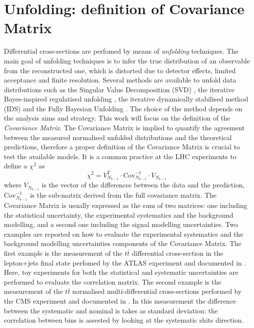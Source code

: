\documentclass[12pt]{article}
\begin{document}
\section{Unfolding: definition of Covariance Matrix}
Differential cross-sections are perfomed by means of \emph{unfolding} techniques. The main goal of unfolding techniques is to infer the true distribution of an observable from the reconstructed one, which is distorted due to detector effects, limited acceptance and finite resolution. 
Several methods are available to unfold data distributions such as the Singular Value Decomposition (SVD) \cite{H_cker_1996}, the iterative Bayes-inspired regulatised unfolding \cite{DAGOSTINI1995487}, the iterative dynamically stabilised method (IDS) \cite{malaescu2009iterative} and the Fully Bayesian Unfolding \cite{choudalakis2012fully}. The choice of the method depends on the analysis aims and strategy. 
This work will focus on the definition of the \emph{Covariance Matrix}. The Covariance Matrix is implied to quantify the agreement between the measured normalised unfolded distributions and the theoretical predictions, therefore a proper definition of the Covariance Matrix is crucial to test the available models. It is a common practice at the LHC experiments to define a $\chi^2$ as
\begin{equation}
\chi^2 = V^T_{N_{b-1}}\cdot\mathrm{Cov}^{-1}_{N_{b-1}}\cdot V_{N_{b-1}}
\end{equation}
where $V_{N_{b-1}}$ is the vector of the differences between the data and the prediction, $\mathrm{Cov}^{-1}_{N_{b-1}}$ is the sub-matrix derived from the full covariance matrix.
The Covariance Matrix is usually expressed as the sum of two matrices: one including the statistical uncertainty, the experimental systematics and the background modelling, and a second one including the signal modelling uncertainties. 
Two examples are reported on how to evaluate the experimental systematics and the background modelling uncertainties components of the Covariance Matrix.
The first example is the measurement of the $t\bar{t}$ differential cross-section in the lepton+jets final state perfomed by the ATLAS experiment and documented in \cite{atlas_diffrential}. Here, toy experiments for both the statistical and systematic uncertainties are performed to evaluate the correlation matrix.
The second example is the measurement of the $t\bar{t}$ normalised multi-differential cross-sections performed by the CMS experiment and documented in \cite{Sirunyan_2020}. In this measurement the difference between the systematic and nominal is takes as standard deviation: the correlation between bins is assested by looking at the systematic shits direction.
\end{document}
